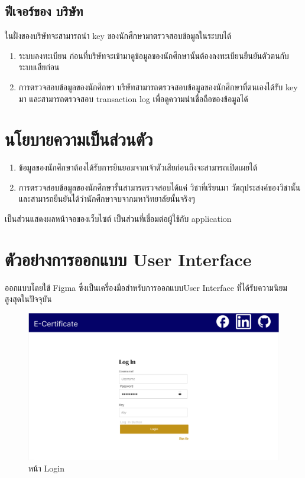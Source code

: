 \subsection{ฟีเจอร์ของ บริษัท}
\enskip \enskip \enskip \enskip \enskip 
ในฝั่งของบริษัทจะสามารถนำ key ของนักศึกษามาตรวจสอบข้อมูลในระบบได้
\begin{enumerate}
  \item ระบบลงทะเบียน ก่อนที่บริษัทจะเข้ามาดูข้อมูลของนักศึกษานั้นต้องลงทะเบียนยืนยันตัวตนกับระบบเสียก่อน
  \item การตรวจสอบข้อมูลของนักศึกษา บริษัทสามารถตรวจสอบข้อมูลของนักศึกษาที่ตนเองได้รับ key มา และสามารถตรวจสอบ transaction log เพื่อดูความน่าเชื่อถือของข้อมูลได้
  \end{enumerate}
\section{นโยบายความเป็นส่วนตัว}
\begin{enumerate}
  \item ข้อมูลของนักศึกษาต้องได้รับการยินยอมจากเจ้าตัวเสียก่อนถึงจะสามารถเปิดเผยได้
  \item การตรวจสอบข้อมูลของนักศึกษารั้นสามารตรวจสอบได้แค่ วิชาที่เรียนมา วัตถุประสงค์ของวิชานั้น และสามารถยืนยันได้ว่านักศึกษาจบจากมหาวิทยาลัยนั้นจริงๆ
  \end{enumerate}
\enskip \enskip \enskip \enskip \enskip 
เป็นส่วนแสดงผลหน้าจอของเว็บไซต์ เป็นส่วนที่เชื่อมต่อผู้ใช้กับ application


\section{ตัวอย่างการออกแบบ User Interface}
\enskip \enskip \enskip \enskip \enskip 
ออกแบบโดยใข้ Figma ซึ่งเป็นเครื่องมือสำหรับการออกแบบUser Interface ที่ได้รับความนิยมสูงสุดในปัจจุบัน

\graphicspath{ {./images/} }
\begin{figure}[htbp]
  \centering 
  \includegraphics[scale=0.5]{figmalogin.png}
  \caption[หน้า Login]{หน้า Login}
  \label{fig:login}
\end{figure}

